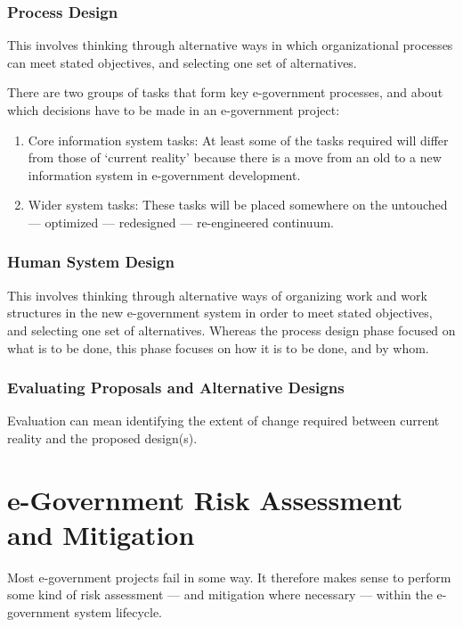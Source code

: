 \subsubsection{Process Design}
This involves thinking through alternative
ways in which organizational processes can
meet stated objectives, and selecting one set
of alternatives.

There are two groups of tasks that form
key e-government processes, and about
which decisions have to be made in an
e-government project:

\begin{enumerate}
	\item Core information system tasks: At least
	some of the tasks required will differ from
	those of `current reality’ because there is
	a move from an old to a new information
	system in e-government development.
	\item Wider system tasks: These tasks will be
	placed somewhere on the untouched —	optimized — redesigned — re-engineered
	continuum.
\end{enumerate}

\subsubsection{Human System Design}
This involves thinking through alternative ways of organizing work and work structures in the new e-government system in order to meet stated objectives, and selecting one set of alternatives. Whereas the process design phase focused on what is to be done, this phase focuses on how it is to be done, and by whom.


\subsubsection{Evaluating Proposals and Alternative Designs}
Evaluation
can mean identifying the extent of change
required between current reality and the
proposed design(s).

\section{e-Government Risk Assessment and Mitigation}
Most e-government projects fail in some way. It therefore makes sense
to perform some kind of risk assessment — and mitigation where necessary — within the
e-government system lifecycle.

